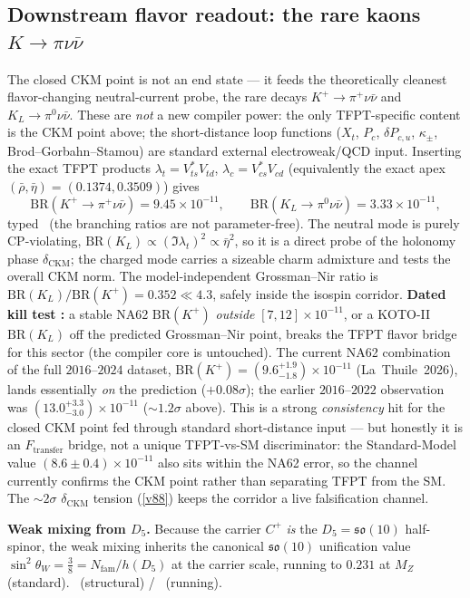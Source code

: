 \documentclass[11pt,a4paper]{article}
\newcommand{\Nfam}{N_{\mathrm{fam}}}
\theoremstyle{definition}
\begin{document}
\subsection{Downstream flavor readout: the rare kaons $K\to\pi\nu\bar\nu$}
\label{sec:rare-kaon}
The closed CKM point is not an end state --- it feeds the theoretically cleanest flavor-changing
neutral-current probe, the rare decays $K^+\!\to\pi^+\nu\bar\nu$ and $K_L\to\pi^0\nu\bar\nu$. These are
\emph{not} a new compiler power: the only TFPT-specific content is the CKM point above; the short-distance
loop functions ($X_t$, $P_c$, $\delta P_{c,u}$, $\kappa_\pm$, Brod--Gorbahn--Stamou) are standard external
electroweak/QCD input. Inserting the exact TFPT products $\lambda_t=V_{ts}^*V_{td}$, $\lambda_c=V_{cs}^*V_{cd}$
(equivalently the exact apex $(\bar\rho,\bar\eta)=(0.1374,0.3509)$) gives 
\[
  \mathrm{BR}(K^+\!\to\pi^+\nu\bar\nu)=9.45\times10^{-11},\qquad
  \mathrm{BR}(K_L\to\pi^0\nu\bar\nu)=3.33\times10^{-11},
\]
typed \mC\ (the branching ratios are not parameter-free). The neutral mode is purely CP-violating,
$\mathrm{BR}(K_L)\propto(\Im\lambda_t)^2\propto\bar\eta^2$, so it is a direct probe of the holonomy phase
$\delta_{\mathrm{CKM}}$; the charged mode carries a sizeable charm admixture and tests the overall CKM norm.
The model-independent Grossman--Nir ratio is $\mathrm{BR}(K_L)/\mathrm{BR}(K^+)=0.352\ll4.3$, safely inside the
isospin corridor. \textbf{Dated kill test \mX:} a stable NA62 $\mathrm{BR}(K^+)$ \emph{outside}
$[7,12]\times10^{-11}$, or a KOTO-II $\mathrm{BR}(K_L)$ off the predicted Grossman--Nir point, breaks the TFPT
flavor bridge for this sector (the compiler core is untouched). The current NA62 combination of the full
$2016$--$2024$ dataset, $\mathrm{BR}(K^+)=(9.6^{+1.9}_{-1.8})\times10^{-11}$ (La~Thuile~2026), lands
essentially \emph{on} the prediction ($+0.08\sigma$); the earlier $2016$--$2022$ observation was
$(13.0^{+3.3}_{-3.0})\times10^{-11}$ ($\sim1.2\sigma$ above). This is a strong \emph{consistency} hit for the
closed CKM point fed through standard short-distance input --- but honestly it is an $F_{\mathrm{transfer}}$
bridge, not a unique TFPT-vs-SM discriminator: the Standard-Model value $(8.6\pm0.4)\times10^{-11}$ also sits
within the NA62 error, so the channel currently confirms the CKM point rather than separating TFPT from the SM.
The $\sim2\sigma$ $\delta_{\mathrm{CKM}}$ tension (\vref{v88}) keeps the corridor a live falsification channel.

\noindent\textbf{Weak mixing from $D_5$.} Because the carrier $C^+$ \emph{is} the $D_5=\mathfrak{so}(10)$
half-spinor, the weak mixing inherits the canonical $\mathfrak{so}(10)$ unification value
$\sin^2\theta_W=\tfrac38=\Nfam/h(D_5)$ at the carrier scale, running to $0.231$ at $M_Z$ (standard).
\mE\ (structural) / \mC\ (running).
\end{document}
